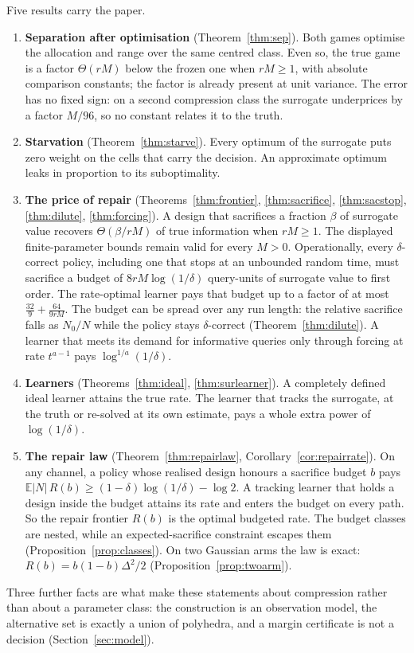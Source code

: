Five results carry the paper.
\begin{enumerate}
\item[1)] \textbf{Separation after optimisation} (Theorem~\ref{thm:sep}). Both games optimise
the allocation and range over the same centred class. Even so, the true game is a factor
$\Theta(rM)$ below the frozen one when $rM\ge1$, with absolute comparison constants; the factor is already present at unit variance. The
error has no fixed sign: on a second compression class the surrogate underprices by a factor
$M/96$, so no constant relates it to the truth.
\item[2)] \textbf{Starvation} (Theorem~\ref{thm:starve}). Every optimum of the surrogate puts
zero weight on the cells that carry the decision. An approximate optimum leaks in proportion
to its suboptimality.
\item[3)] \textbf{The price of repair} (Theorems~\ref{thm:frontier}, \ref{thm:sacrifice},
\ref{thm:sacstop}, \ref{thm:dilute}, \ref{thm:forcing}). A design that sacrifices a fraction
$\beta$ of surrogate value recovers $\Theta(\beta/rM)$ of true information when $rM\ge1$. The displayed finite-parameter bounds remain valid for every $M>0$. Operationally, every
$\delta$-correct policy, including one that stops at an unbounded random time, must sacrifice a
budget of $8rM\log(1/\delta)$ query-units of surrogate value to first order. The rate-optimal
learner pays that budget up to a factor of at most $\frac{32}{9}+\frac{64}{9rM}$.
The budget can be spread over any run length: the relative sacrifice falls as $N_{0}/N$ while
the policy stays $\delta$-correct (Theorem~\ref{thm:dilute}).
A learner that meets its demand for informative queries only through forcing at rate
$t^{a-1}$ pays $\log^{1/a}(1/\delta)$.
\item[4)] \textbf{Learners} (Theorems~\ref{thm:ideal}, \ref{thm:surlearner}). A completely
defined ideal learner attains the true rate. The learner that tracks the surrogate, at the
truth or re-solved at its own estimate, pays a whole extra power of $\log(1/\delta)$.
\item[5)] \textbf{The repair law} (Theorem~\ref{thm:repairlaw},
Corollary~\ref{cor:repairrate}). On any channel, a policy whose realised design honours a
sacrifice budget $b$ pays $\mathbb E|N|\,R(b)\ge(1-\delta)\log(1/\delta)-\log2$. A tracking
learner that holds a
design inside the budget attains its rate and enters the budget on every path. So the repair
frontier $R(b)$ is the optimal budgeted rate. The budget classes are nested, while an
expected-sacrifice constraint escapes them (Proposition~\ref{prop:classes}). On two Gaussian
arms the law is exact: $R(b)=b(1-b)\Delta^2/2$ (Proposition~\ref{prop:twoarm}).
\end{enumerate}
Three further facts are what make these statements about compression rather than about a
parameter class: the construction is an observation model, the alternative set is exactly a
union of polyhedra, and a margin certificate is not a decision (Section~\ref{sec:model}).

